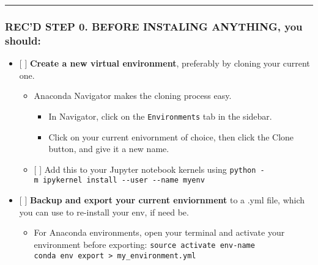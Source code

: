 \documentclass[11pt]{article}
\providecommand{\tightlist}{%
      \setlength{\itemsep}{0pt}\setlength{\parskip}{0pt}}
\begin{document}
\begin{center}\rule{0.5\linewidth}{\linethickness}\end{center}

\hypertarget{recd-step-0.-before-instaling-anything-you-should}{%
\subsubsection{\texorpdfstring{REC'D STEP 0. \textbf{BEFORE INSTALING
ANYTHING}, you
should:}{REC'D STEP 0. BEFORE INSTALING ANYTHING, you should: }}\label{recd-step-0.-before-instaling-anything-you-should}}

\begin{itemize}
\tightlist
\item
  {[} {]} \textbf{Create a new virtual environment}, preferably by
  cloning your current one.

  \begin{itemize}
  \tightlist
  \item
    Anaconda Navigator makes the cloning process easy.

    \begin{itemize}
    \tightlist
    \item
      In Navigator, click on the \texttt{Environments} tab in the
      sidebar.
    \item
      Click on your current enivornment of choice, then click the Clone
      button, and give it a new name.
    \end{itemize}
  \item
    {[} {]} Add this to your Jupyter notebook kernels using
    \texttt{python\ -m\ ipykernel\ install\ -\/-user\ -\/-name\ myenv}
  \end{itemize}
\item
  {[} {]} \textbf{Backup and export your current enviornment} to a .yml
  file, which you can use to re-install your env, if need be.

  \begin{itemize}
  \tightlist
  \item
    For Anaconda environments, open your terminal and activate your
    environment before exporting: \texttt{source\ activate\ env-name}
    \texttt{conda\ env\ export\ \textgreater{}\ my\_environment.yml}


\end{itemize}
\end{itemize}
\end{document}

